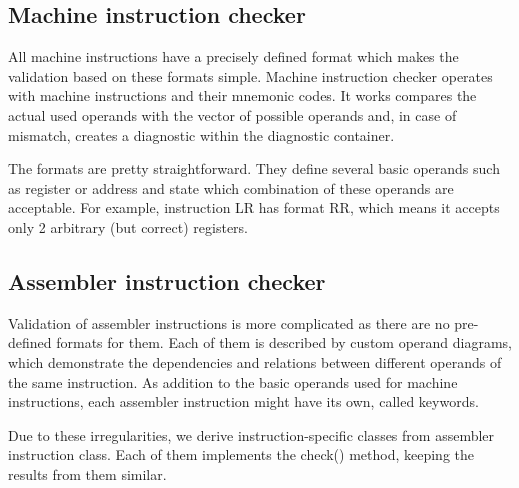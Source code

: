 \subsection{Machine instruction checker}

All machine instructions have a precisely defined format which makes the validation based on these formats simple. Machine instruction checker operates with machine instructions and their mnemonic codes. It works  compares the actual used operands with the vector of possible operands and, in case of mismatch, creates a diagnostic within the diagnostic container.

The formats are pretty straightforward. They define several basic operands such as register or address and state which combination of these operands are acceptable. For example, instruction LR has format RR, which means it accepts only 2 arbitrary (but correct) registers. 

\subsection{Assembler instruction checker}
\label{sub:asm_check}

Validation of assembler instructions is more complicated as there are no pre-defined formats for them. Each of them is described by custom operand diagrams, which demonstrate the dependencies and relations between different operands of the same instruction. As addition to the basic operands used for machine instructions, each assembler instruction might have its own, called keywords.

Due to these irregularities, we derive instruction-specific classes from assembler instruction class. Each of them implements the check() method, keeping the results from them similar.

